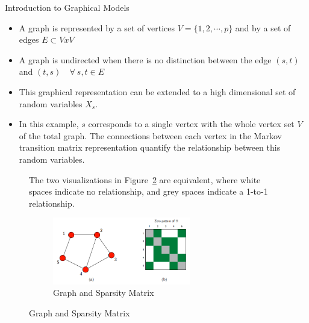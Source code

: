 \documentclass{beamer}
\begin{document}
\begin{frame}{Introduction to Graphical Models}
    \footnotesize
  \begin{itemize}
      \item A graph is represented by a set of vertices $V = \{1, 2, \dotsb, p\}$ and by a set of edges $E \subset V x V$
      \item A graph is undirected when there is no distinction between the edge $(s, t)$ and $(t, s) \quad \forall \ s, t \in E$
    \item This graphical representation can be extended to a high dimensional set of random variables $X_{s}$.
    \item In this example, $s$ corresponds to a single vertex with the whole vertex set $V$ of the total graph.
    The connections between each vertex in the Markov transition matrix representation quantify the relationship between this random variables.
  \end{itemize}
  \begin{figure}
  \begin{minipage}{0.4\textwidth}
      The two visualizations in Figure~\ref{fig:IntroPic} are equivalent, where white spaces indicate no relationship, and grey spaces indicate a 1-to-1 relationship.
  \end{minipage}%
  \begin{minipage}{0.6\textwidth}
    \begin{figure}
       \includegraphics[width=6cm]{IntroGraphMat.png}
       \caption{Graph and Sparsity Matrix}
       \label{fig:IntroPic}
  \end{figure} 
  \end{minipage}
  \end{figure}
\end{frame}
\end{document}
